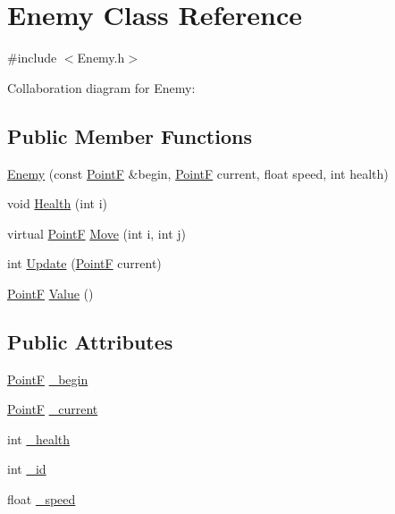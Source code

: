 \hypertarget{class_enemy}{}\section{Enemy Class Reference}
\label{class_enemy}


{\ttfamily \#include $<$Enemy.\+h$>$}



Collaboration diagram for Enemy\+:
\subsection*{Public Member Functions}
\begin{DoxyCompactItemize}
\item 
\hyperlink{class_enemy_a071d0a60046e25ffe08ea7be368d6693}{Enemy} (const \hyperlink{drawtools_8h_adc4a66bcb59b74164130ed47cb387ec3}{PointF} \&begin, \hyperlink{drawtools_8h_adc4a66bcb59b74164130ed47cb387ec3}{PointF} current, float speed, int health)
\item 
void \hyperlink{class_enemy_a7eb5149d39871cd4b004af55544e7764}{Health} (int i)
\item 
virtual \hyperlink{drawtools_8h_adc4a66bcb59b74164130ed47cb387ec3}{PointF} \hyperlink{class_enemy_a0ce854e74bf13c8e0d272490e29e4542}{Move} (int i, int j)
\item 
int \hyperlink{class_enemy_a1468172359f52b6f3616d3dddf5d2b0b}{Update} (\hyperlink{drawtools_8h_adc4a66bcb59b74164130ed47cb387ec3}{PointF} current)
\item 
\hyperlink{drawtools_8h_adc4a66bcb59b74164130ed47cb387ec3}{PointF} \hyperlink{class_enemy_a2fb6127ab87c9cb03eda0c1da8cefd81}{Value} ()
\end{DoxyCompactItemize}
\subsection*{Public Attributes}
\begin{DoxyCompactItemize}
\item 
\hyperlink{drawtools_8h_adc4a66bcb59b74164130ed47cb387ec3}{PointF} \hyperlink{class_enemy_a01a372cdebe6f7c5aa819aff02e3d817}{\+\_\+begin}
\item 
\hyperlink{drawtools_8h_adc4a66bcb59b74164130ed47cb387ec3}{PointF} \hyperlink{class_enemy_a2e53518ca8125c08fd204e3bf810fc8d}{\+\_\+current}
\item 
int \hyperlink{class_enemy_a410845277e89ce6c73b2df15d0621cf7}{\+\_\+health}
\item 
int \hyperlink{class_enemy_abb5f5667c06218536bf516b249d2d4cb}{\+\_\+id}
\item 
float \hyperlink{class_enemy_a5ad8a827b28dd24331a434d1993d5c01}{\+\_\+speed}
\end{DoxyCompactItemize}



